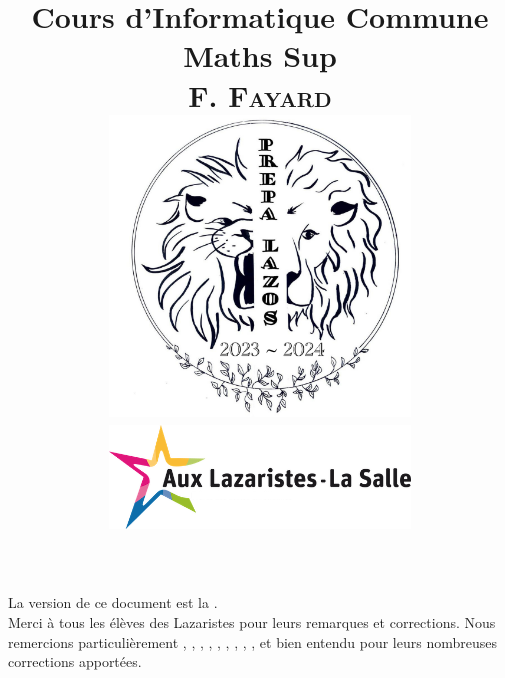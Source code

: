 \documentclass[book]{magnoliaold}
\title{{\Huge\bf Cours d'Informatique Commune}\\\vspace{1cm}
       \textbf{\Huge Maths Sup}\\\vspace{1cm}
       \textsc{F. Fayard}\\\vspace{1cm}
       \includegraphics[width=8cm]{../../Commun/Images/lazos-bde-2024.png}\\%
       \includegraphics[width=8cm]{../../Commun/Images/lazos.png}}
\begin{document}
\maketitle

La version de ce document est la \textsc{\GITAbrHash}.\\


Merci à tous les élèves des Lazaristes pour leurs remarques et corrections. Nous remercions particulièrement
, , , , , , , , ,  et bien entendu  pour leurs
nombreuses corrections apportées.\\

\vfill
\end{document}
